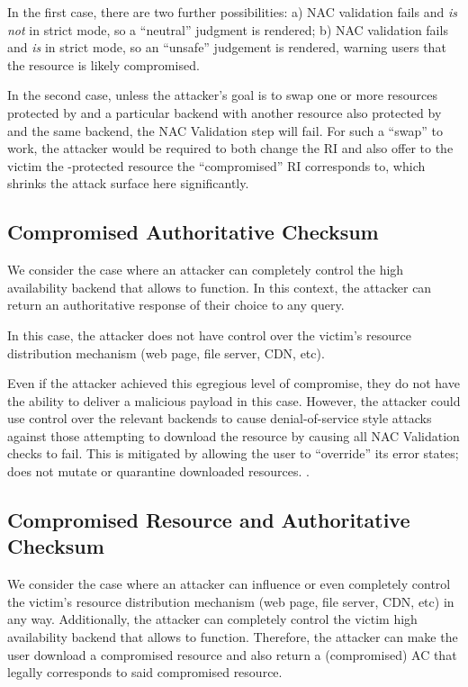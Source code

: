 In the first case, there are two further possibilities: a) NAC validation fails
and \SYSTEM{} \emph{is not} in strict mode, so a ``neutral'' judgment is
rendered; b) NAC validation fails and \SYSTEM{} \emph{is} in strict mode, so an
``unsafe'' judgement is rendered, warning users that the resource is likely
compromised. 

In the second case, unless the attacker's goal is to swap one or more resources
protected by \SYSTEM{} and a particular backend with another resource also
protected by \SYSTEM{} and the same backend, the NAC Validation step will fail.
For such a ``swap'' to work, the attacker would be required to both change the
RI and also offer to the victim the \SYSTEM{}-protected resource the
``compromised'' RI corresponds to, which shrinks the attack surface here
significantly. 

\subsection{Compromised Authoritative Checksum}

We consider the case where an attacker can completely control the high
availability backend that allows \SYSTEM{} to function. In this context, the
attacker can return an authoritative response of their choice to any query.

In this case, the attacker does not have control over the victim's resource
distribution mechanism (web page, file server, CDN, etc).

Even if the attacker achieved this egregious level of compromise, they do not
have the ability to deliver a malicious payload in this case. However, the
attacker could use control over the relevant backends to cause denial-of-service
style attacks against those attempting to download the resource by causing all
NAC Validation checks to fail. This is mitigated by \SYSTEM{} allowing the user
to ``override'' its error states; \ie \SYSTEM{} does not mutate or quarantine
downloaded resources. .

\subsection{Compromised Resource and Authoritative Checksum}

We consider the case where an attacker can influence or even completely control
the victim's resource distribution mechanism (web page, file server, CDN, etc)
in any way. Additionally, the attacker can completely control the victim high
availability backend that allows \SYSTEM{} to function. Therefore, the attacker
can make the user download a compromised resource and also return a
(compromised) AC that legally corresponds to said compromised resource.
